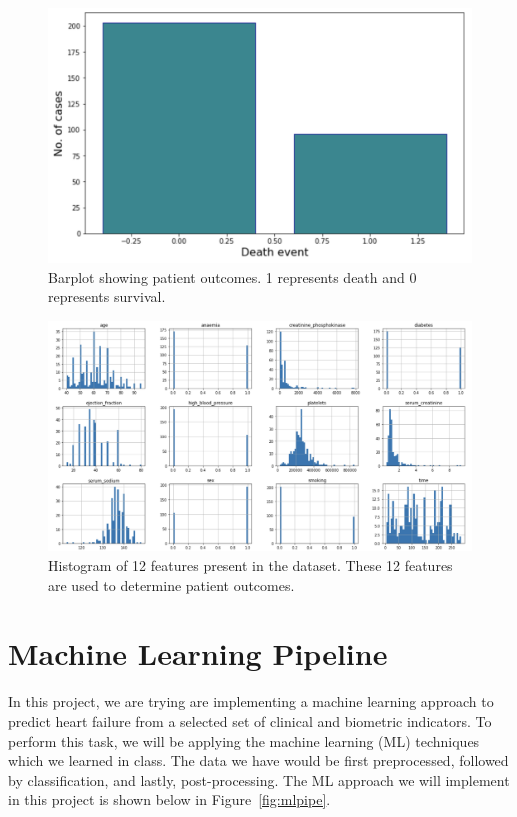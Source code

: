 \documentclass{article}
\begin{document}
\begin{figure}[h]
    \centering
    \includegraphics[width=0.55\linewidth]{outcomeEDA.png}
    \caption{Barplot showing patient outcomes. 1 represents death and 0 represents survival.}
    \label{fig:outcomeEDA}
\end{figure}

\begin{figure}[h]
    \centering
    \includegraphics[width=0.98\linewidth]{featuresEDA.png}
    \caption{Histogram of 12 features present in the dataset. These 12 features are used to determine patient outcomes.}
    \label{fig:featuresEDA}
\end{figure}

\section{Machine Learning Pipeline}

In this project, we are trying are implementing a machine learning approach to predict heart failure from a selected set of clinical and biometric indicators. To perform this task, we will be applying the machine learning (ML) techniques which we learned in class. The data we have would be first preprocessed, followed by classification, and lastly, post-processing. The ML approach we will implement in this project is shown below in Figure~\ref{fig:mlpipe}.
\end{document}
